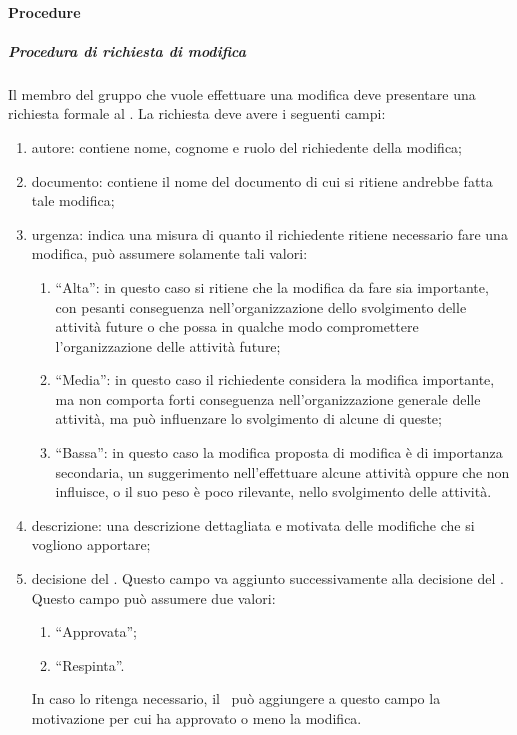 \documentclass[../NormeProgetto.tex]{subfiles}
\begin{document}
		\paragraph{Procedure}
			\subparagraph{Procedura di richiesta di modifica}
				Il membro del gruppo che vuole effettuare una modifica deve presentare una richiesta formale al \responsabilediprogetto. La richiesta deve avere i seguenti campi:
				\begin{enumerate}
					\item autore: contiene nome, cognome e ruolo del richiedente della modifica;
					\item documento: contiene il nome del documento di cui si ritiene andrebbe fatta tale modifica;
					\item urgenza: indica una misura di quanto il richiedente ritiene necessario fare una modifica, può assumere solamente tali valori:
						\begin{enumerate}
							\item ``Alta'': in questo caso si ritiene che la modifica da fare sia importante, con pesanti conseguenza nell'organizzazione dello svolgimento delle attività future o che possa in qualche modo compromettere l'organizzazione delle attività future;
							\item ``Media'': in questo caso il richiedente considera la modifica importante, ma non comporta forti conseguenza nell'organizzazione generale delle attività, ma può influenzare lo svolgimento di alcune di queste;
							\item ``Bassa'': in questo caso la modifica proposta di modifica è di importanza secondaria, un suggerimento nell'effettuare alcune attività oppure che non influisce, o il suo peso è poco rilevante, nello svolgimento delle attività.
						\end{enumerate}
					\item descrizione: una descrizione dettagliata e motivata delle modifiche che si vogliono apportare;
					\item decisione del \responsabilediprogetto. Questo campo va aggiunto successivamente alla decisione del \responsabilediprogetto. Questo campo può assumere due valori:
						\begin{enumerate}
							\item ``Approvata'';
							\item ``Respinta''.
						\end{enumerate}
					In caso lo ritenga necessario, il \responsabilediprogetto\ può aggiungere a questo campo la motivazione per cui ha approvato o meno la modifica.
				\end{enumerate}
\end{document}
